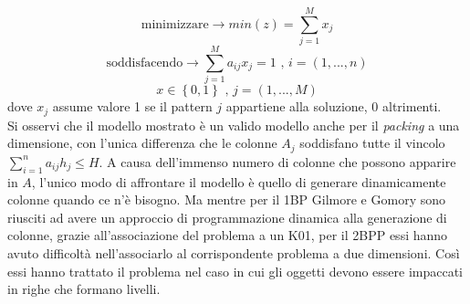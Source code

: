 \documentclass[12pt,a4paper,openright,twoside]{report}
\begin{document}
$$\mbox{minimizzare} \longrightarrow min(z) = \sum^{M}_{j=1}x_{j}$$
$$\mbox{soddisfacendo} \longrightarrow \sum^{M}_{j=1}a_{ij}x_{j} = 1 \mbox{ , } i = (1,...,n)$$ 
$$x \in \left\lbrace 0,1 \right\rbrace \mbox{ , } j = (1,...,M)$$
dove $x_{j}$ assume valore 1 se il pattern $j$ appartiene alla soluzione, 0 altrimenti.\\
Si osservi che il modello mostrato \`{e} un valido modello anche per il \textit{packing} a una dimensione, con l'unica differenza che le colonne $A_{j}$ soddisfano tutte il vincolo $\sum_{i=1}^{n}a_{ij}h_{j} \leq H$.
A causa dell'immenso numero di colonne che possono apparire in $A$, l'unico modo di affrontare il modello \`{e} quello di generare dinamicamente colonne quando ce n'\`{e} bisogno. Ma mentre per il 1BP Gilmore e Gomory sono riusciti ad avere un approccio di programmazione dinamica alla generazione di colonne, grazie all'associazione del problema a un K01, per il 2BPP essi hanno avuto difficolt\`{a} nell'associarlo al corrispondente problema a due dimensioni. Cos\`{i} essi hanno trattato il problema nel caso in cui gli oggetti devono essere impaccati in righe che formano livelli.
\end{document}
